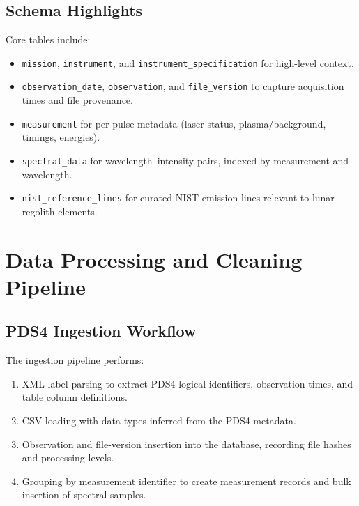 \documentclass[12pt,a4paper]{article}
\begin{document}
\subsection{Schema Highlights}

Core tables include:

\begin{itemize}[nosep]
  \item \texttt{mission}, \texttt{instrument}, and \texttt{instrument\_specification} for high-level context.
  \item \texttt{observation\_date}, \texttt{observation}, and \texttt{file\_version} to capture acquisition times and file provenance.
  \item \texttt{measurement} for per-pulse metadata (laser status, plasma/background, timings, energies).
  \item \texttt{spectral\_data} for wavelength–intensity pairs, indexed by measurement and wavelength.
  \item \texttt{nist\_reference\_lines} for curated NIST emission lines relevant to lunar regolith elements.
\end{itemize}

\section{Data Processing and Cleaning Pipeline}
\label{sec:processing}

\subsection{PDS4 Ingestion Workflow}

The ingestion pipeline performs:

\begin{enumerate}[nosep]
  \item XML label parsing to extract PDS4 logical identifiers, observation times, and table column definitions.
  \item CSV loading with data types inferred from the PDS4 metadata.
  \item Observation and file-version insertion into the database, recording file hashes and processing levels.
  \item Grouping by measurement identifier to create measurement records and bulk insertion of spectral samples.
\end{enumerate}
\end{document}
